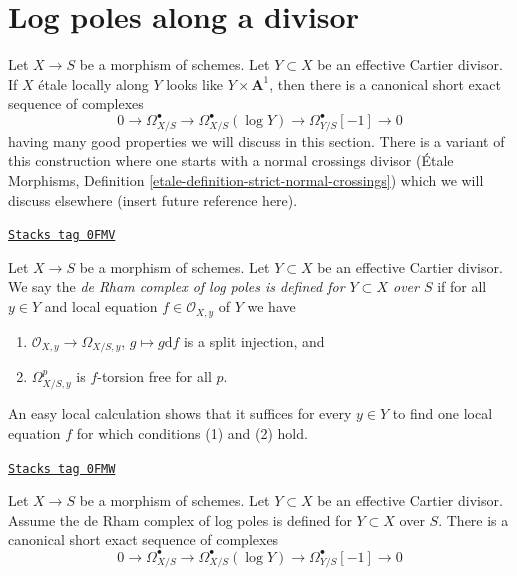 \section{Log poles along a divisor}
\label{derham-section-divisor}
Let $X \to S$ be a morphism of schemes. Let $Y \subset X$ be an
effective Cartier divisor. If $X$ \'etale locally along $Y$ looks
like $Y \times \mathbf{A}^1$, then there is a canonical short exact sequence
of complexes
$$
0 \to \Omega^\bullet_{X/S} \to
\Omega^\bullet_{X/S}(\log Y) \to
\Omega^\bullet_{Y/S}[-1] \to 0
$$
having many good properties we will discuss in this section. There is a
variant of this construction where one starts with a normal crossings
divisor
(\'Etale Morphisms, Definition \ref{etale-definition-strict-normal-crossings})
which we will discuss elsewhere (insert future reference here).

\begin{definition}
\label{derham-definition-local-product}
\href{https://stacks.math.columbia.edu/tag/0FMV}{\texttt{Stacks tag 0FMV}}

Let $X \to S$ be a morphism of schemes. Let $Y \subset X$ be an
effective Cartier divisor. We say the
{\it de Rham complex of log poles is defined for $Y \subset X$ over $S$}
if for all $y \in Y$ and local equation $f \in \mathcal{O}_{X, y}$
of $Y$ we have
\begin{enumerate}
\item $\mathcal{O}_{X, y} \to \Omega_{X/S, y}$, $g \mapsto g \text{d}f$
is a split injection, and
\item $\Omega^p_{X/S, y}$ is $f$-torsion free for all $p$.
\end{enumerate}
\end{definition}

An easy local calculation shows that it suffices for every $y \in Y$
to find one local equation $f$ for which conditions (1) and (2) hold.

\begin{lemma}
\label{derham-lemma-log-complex}
\href{https://stacks.math.columbia.edu/tag/0FMW}{\texttt{Stacks tag 0FMW}}

Let $X \to S$ be a morphism of schemes. Let $Y \subset X$ be an
effective Cartier divisor.
Assume the de Rham complex of log poles is defined for $Y \subset X$ over $S$.
There is a canonical short exact sequence
of complexes
$$
0 \to \Omega^\bullet_{X/S} \to
\Omega^\bullet_{X/S}(\log Y) \to
\Omega^\bullet_{Y/S}[-1] \to 0
$$
\end{lemma}


